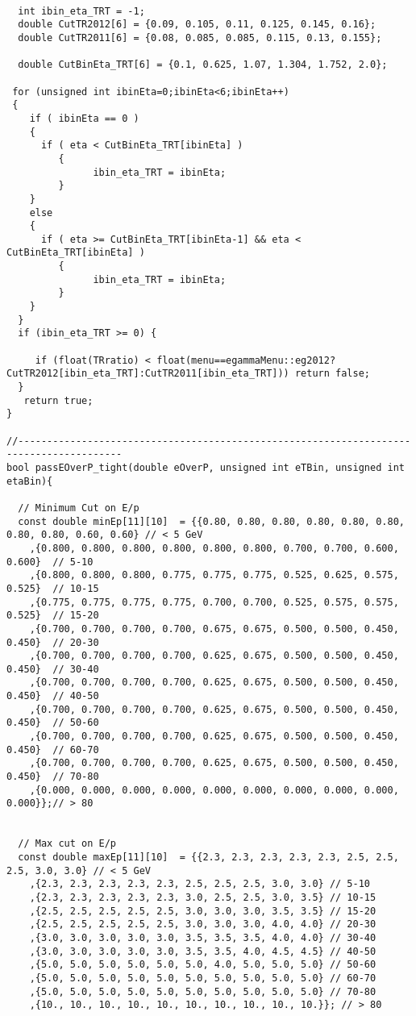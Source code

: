 \begin{lstlisting}
 
  int ibin_eta_TRT = -1;
  double CutTR2012[6] = {0.09, 0.105, 0.11, 0.125, 0.145, 0.16};
  double CutTR2011[6] = {0.08, 0.085, 0.085, 0.115, 0.13, 0.155};
  
  double CutBinEta_TRT[6] = {0.1, 0.625, 1.07, 1.304, 1.752, 2.0};

 for (unsigned int ibinEta=0;ibinEta<6;ibinEta++) 
 {
    if ( ibinEta == 0 )
    {
      if ( eta < CutBinEta_TRT[ibinEta] ) 
         {
	           ibin_eta_TRT = ibinEta;
         }
    } 
    else 
    {
      if ( eta >= CutBinEta_TRT[ibinEta-1] && eta < CutBinEta_TRT[ibinEta] ) 
         {
	           ibin_eta_TRT = ibinEta;
         }
    }
  }
  if (ibin_eta_TRT >= 0) {

     if (float(TRratio) < float(menu==egammaMenu::eg2012?CutTR2012[ibin_eta_TRT]:CutTR2011[ibin_eta_TRT])) return false; 
  } 
   return true;
}

//----------------------------------------------------------------------------------------
bool passEOverP_tight(double eOverP, unsigned int eTBin, unsigned int etaBin){

  // Minimum Cut on E/p 
  const double minEp[11][10]  = {{0.80, 0.80, 0.80, 0.80, 0.80, 0.80, 0.80, 0.80, 0.60, 0.60} // < 5 GeV
	,{0.800, 0.800, 0.800, 0.800, 0.800, 0.800, 0.700, 0.700, 0.600, 0.600}  // 5-10  
	,{0.800, 0.800, 0.800, 0.775, 0.775, 0.775, 0.525, 0.625, 0.575, 0.525}  // 10-15
	,{0.775, 0.775, 0.775, 0.775, 0.700, 0.700, 0.525, 0.575, 0.575, 0.525}  // 15-20
	,{0.700, 0.700, 0.700, 0.700, 0.675, 0.675, 0.500, 0.500, 0.450, 0.450}  // 20-30
	,{0.700, 0.700, 0.700, 0.700, 0.625, 0.675, 0.500, 0.500, 0.450, 0.450}  // 30-40
	,{0.700, 0.700, 0.700, 0.700, 0.625, 0.675, 0.500, 0.500, 0.450, 0.450}  // 40-50
	,{0.700, 0.700, 0.700, 0.700, 0.625, 0.675, 0.500, 0.500, 0.450, 0.450}  // 50-60
	,{0.700, 0.700, 0.700, 0.700, 0.625, 0.675, 0.500, 0.500, 0.450, 0.450}  // 60-70
	,{0.700, 0.700, 0.700, 0.700, 0.625, 0.675, 0.500, 0.500, 0.450, 0.450}  // 70-80
	,{0.000, 0.000, 0.000, 0.000, 0.000, 0.000, 0.000, 0.000, 0.000, 0.000}};// > 80  
                  

  // Max cut on E/p
  const double maxEp[11][10]  = {{2.3, 2.3, 2.3, 2.3, 2.3, 2.5, 2.5, 2.5, 3.0, 3.0} // < 5 GeV
	,{2.3, 2.3, 2.3, 2.3, 2.3, 2.5, 2.5, 2.5, 3.0, 3.0} // 5-10  
	,{2.3, 2.3, 2.3, 2.3, 2.3, 3.0, 2.5, 2.5, 3.0, 3.5} // 10-15
	,{2.5, 2.5, 2.5, 2.5, 2.5, 3.0, 3.0, 3.0, 3.5, 3.5} // 15-20
	,{2.5, 2.5, 2.5, 2.5, 2.5, 3.0, 3.0, 3.0, 4.0, 4.0} // 20-30
	,{3.0, 3.0, 3.0, 3.0, 3.0, 3.5, 3.5, 3.5, 4.0, 4.0} // 30-40
	,{3.0, 3.0, 3.0, 3.0, 3.0, 3.5, 3.5, 4.0, 4.5, 4.5} // 40-50
	,{5.0, 5.0, 5.0, 5.0, 5.0, 5.0, 4.0, 5.0, 5.0, 5.0} // 50-60
	,{5.0, 5.0, 5.0, 5.0, 5.0, 5.0, 5.0, 5.0, 5.0, 5.0} // 60-70
	,{5.0, 5.0, 5.0, 5.0, 5.0, 5.0, 5.0, 5.0, 5.0, 5.0} // 70-80
	,{10., 10., 10., 10., 10., 10., 10., 10., 10., 10.}}; // > 80    
             

\end{lstlisting}
